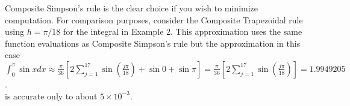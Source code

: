 Composite Simpson's rule is the clear choice if you wish to minimize computation. For comparison purposes, consider the Composite Trapezoidal rule using $h=\pi / 18$ for the integral in Example 2. This approximation uses the same function evaluations as Composite Simpson's rule but the approximation in this case\\
$\int_{0}^{\pi} \sin x d x \approx \frac{\pi}{36}\left[2 \sum_{j=1}^{17} \sin \left(\frac{j \pi}{18}\right)+\sin 0+\sin \pi\right]=\frac{\pi}{36}\left[2 \sum_{j=1}^{17} \sin \left(\frac{j \pi}{18}\right)\right]=1.9949205$.\\
is accurate only to about $5 \times 10^{-3}$.\\
%
%
%
%
%
%
%
%
%

